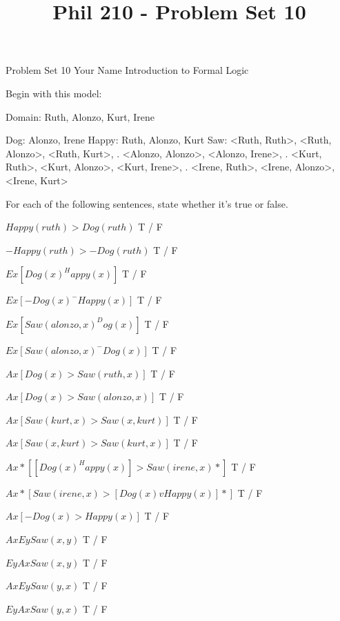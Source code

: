 
\title{Phil 210 - Problem Set 10}

\heading
Problem Set 10
Your Name
Introduction to Formal Logic
\endheading

Begin with this model:

\answer
        \firstordermodel 
        Domain: Ruth, Alonzo, Kurt, Irene

        Dog:    Alonzo, Irene
        Happy:  Ruth, Alonzo, Kurt
        Saw:    <Ruth, Ruth>, <Ruth, Alonzo>, <Ruth, Kurt>,
           .    <Alonzo, Alonzo>, <Alonzo, Irene>,
           .    <Kurt, Ruth>, <Kurt, Alonzo>, <Kurt, Irene>,
           .    <Irene, Ruth>, <Irene, Alonzo>, <Irene, Kurt>
        \endfirstordermodel
\endanswer\bigskip

For each of the following sentences, state whether it's true or false.

\quantifiers
\problems
{}
$ Happy(ruth) > Dog(ruth) $
        \answer
         T / F
        \endanswer

$ -Happy(ruth) > -Dog(ruth) $
        \answer
         T / F
        \endanswer

$ Ex[Dog(x) ^ Happy(x)] $
        \answer
         T / F
        \endanswer

$ Ex[-Dog(x) ^ -Happy(x)] $
        \answer
         T / F
        \endanswer

$ Ex[Saw(alonzo,x) ^ Dog(x)] $
        \answer
         T / F
        \endanswer

$ Ex[Saw(alonzo,x) ^ -Dog(x)] $
        \answer
         T / F
        \endanswer

$ Ax[Dog(x) > Saw(ruth,x)] $
        \answer
         T / F
        \endanswer

$ Ax[Dog(x) > Saw(alonzo,x)] $
        \answer
         T / F
        \endanswer

$ Ax[Saw(kurt,x) > Saw(x,kurt)] $
        \answer
         T / F
        \endanswer

$ Ax[Saw(x,kurt) > Saw(kurt,x)] $
        \answer
         T / F
        \endanswer

$ Ax*[[Dog(x) ^ Happy(x)] > Saw(irene,x)*] $
        \answer
         T / F
        \endanswer

$ Ax*[Saw(irene,x) > [Dog(x) v Happy(x)]*] $
        \answer
         T / F
        \endanswer

$ Ax[-Dog(x) > Happy(x)] $
        \answer
         T / F
        \endanswer

$ Ax Ey Saw(x,y) $
        \answer
         T / F
        \endanswer

$ Ey Ax Saw(x,y) $
        \answer
         T / F
        \endanswer

$ Ax Ey Saw(y,x) $
        \answer
         T / F
        \endanswer

$ Ey Ax Saw(y,x) $
        \answer
         T / F
        \endanswer

\endproblems
\bye
